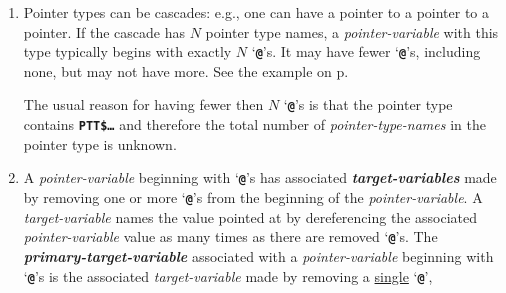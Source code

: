 \documentclass[12pt]{article}
\newcommand{\TT}[1]{{\tt \bfseries #1}}
\newcommand{\emkey}[1]{{\em \bfseries #1}}
\newcommand{\pagref}[1]{p\pageref{#1}}
\newenvironment{indpar}[1][0.3in]%
	{\begin{list}{}%
		     {\setlength{\itemsep}{0in}%
		      \setlength{\topsep}{0in}%
		      \setlength{\parsep}{1ex}%
		      \setlength{\labelwidth}{#1}%
		      \setlength{\leftmargin}{#1}%
		      \addtolength{\leftmargin}{\labelsep}}%
	 \item}%
	{\end{list}}
\begin{document}
\begin{indpar}
\begin{enumerate}
\item
Pointer types can be cascades: e.g., one can have a pointer to a pointer
to a pointer.  If the cascade has $N$ pointer type names, a
{\em pointer-variable}
with this type typically begins with exactly $N$ `\TT{@}'s.
It may have fewer `\TT{@}'s, including none, but may not have more.
See the example on \pagref{POINTER-DEREFERENCE-EXAMPLE}.

The usual reason for having fewer then $N$ `\TT{@}'s is that
the pointer type contains \TT{PTT\$\ldots} and therefore the total number of
{\em pointer-type-names} in the pointer type is unknown.

\item
A {\em pointer-variable} beginning with `\TT{@}'s
has associated \emkey{target-variables}
made by removing one or more `\TT{@}'s from the beginning of the
{\em pointer-variable}.  A {\em target-variable}
names the value pointed at by dereferencing the associated
{\em pointer-variable}
value as many times as there are removed `\TT{@}'s.  The
\emkey{primary-target-variable} associated with a {\em pointer-variable}
beginning with `\TT{@}'s
is the associated {\em target-variable} made by removing
a \underline{single} `\TT{@}',
\end{enumerate}
\end{indpar}
\end{document}
